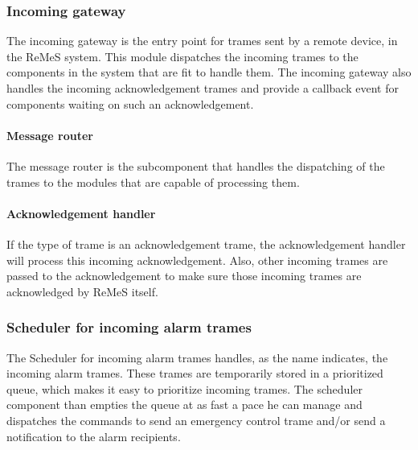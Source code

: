 \subsubsection{Incoming gateway}
The incoming gateway is the entry point for trames sent by a remote device, in the ReMeS system.
This module dispatches the incoming trames to the components in the system that are fit to handle
them. The incoming gateway also handles the incoming acknowledgement trames and provide a callback event for components waiting on such an acknowledgement.
\paragraph{Message router}
The message router is the subcomponent that handles the dispatching of the trames to the modules
that are capable of processing them. 
\paragraph{Acknowledgement handler}
If the type of trame is an acknowledgement trame, the acknowledgement handler will process this incoming acknowledgement. Also, other incoming trames are passed to the acknowledgement to make sure those incoming trames are acknowledged by ReMeS itself.
\subsubsection{Scheduler for incoming alarm trames}
The Scheduler for incoming alarm trames handles, as the name indicates, the incoming alarm trames.
These trames are temporarily stored in a prioritized queue, which makes it easy to prioritize
incoming trames. The scheduler component than empties the queue at as fast a pace he can manage
and dispatches the commands to send an emergency control trame and/or send a notification
to the alarm recipients.
